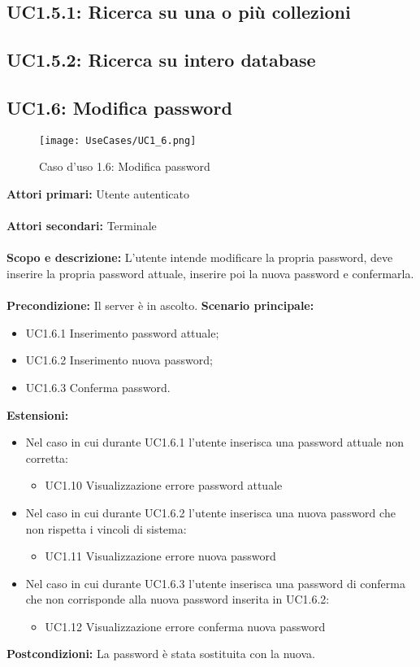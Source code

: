 \documentclass{scalatekids-article}
\begin{document}
\subsection{UC1.5.1: Ricerca su una o più collezioni}

\subsection{UC1.5.2: Ricerca su intero database}

\subsection{UC1.6: Modifica password}
\begin{figure}[H]
  \begin{center}
    \texttt{[image: UseCases/UC1\_6.png]}
    \caption*{Caso d'uso 1.6: Modifica password}
  \end{center}
\end{figure}
\textbf{Attori primari:} Utente autenticato\\ \\
\textbf{Attori secondari:} Terminale\\ \\
\textbf{Scopo e descrizione:} L'utente intende modificare la propria password, deve inserire la propria password attuale, inserire poi la nuova password e confermarla.\\ \\
\textbf{Precondizione:} Il server è in ascolto.
\textbf{Scenario principale:}
\begin{itemize}
\item UC1.6.1 Inserimento password attuale;
\item UC1.6.2 Inserimento nuova password;
\item UC1.6.3 Conferma password.
\end{itemize}
\textbf{Estensioni:} %
\begin{itemize}
  \item Nel caso in cui durante UC1.6.1 l'utente inserisca una password attuale non corretta:
  \begin{itemize}
    \item UC1.10 Visualizzazione errore password attuale
  \end{itemize}
  \item Nel caso in cui durante UC1.6.2 l'utente inserisca una nuova password che non rispetta i vincoli di sistema:
  \begin{itemize}
    \item UC1.11 Visualizzazione errore nuova password
  \end{itemize}
  \item Nel caso in cui durante UC1.6.3 l'utente inserisca una password di conferma che non corrisponde alla nuova password inserita in UC1.6.2:
  \begin{itemize}
    \item UC1.12 Visualizzazione errore conferma nuova password
  \end{itemize}
\end{itemize}
\textbf{Postcondizioni:} La password è stata sostituita con la nuova.
\end{document}
